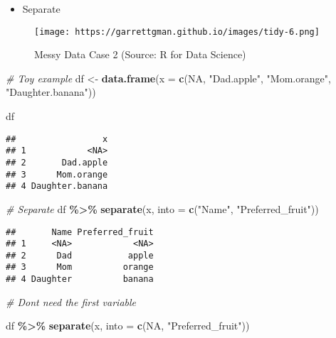 \documentclass[
]{book}
\newenvironment{Shaded}{\begin{snugshade}}{\end{snugshade}}
\newcommand{\CommentTok}[1]{\textcolor[rgb]{0.56,0.35,0.01}{\textit{#1}}}
\newcommand{\DataTypeTok}[1]{\textcolor[rgb]{0.13,0.29,0.53}{#1}}
\newcommand{\KeywordTok}[1]{\textcolor[rgb]{0.13,0.29,0.53}{\textbf{#1}}}
\newcommand{\NormalTok}[1]{#1}
\newcommand{\OperatorTok}[1]{\textcolor[rgb]{0.81,0.36,0.00}{\textbf{#1}}}
\newcommand{\OtherTok}[1]{\textcolor[rgb]{0.56,0.35,0.01}{#1}}
\newcommand{\StringTok}[1]{\textcolor[rgb]{0.31,0.60,0.02}{#1}}
\providecommand{\tightlist}{%
  \setlength{\itemsep}{0pt}\setlength{\parskip}{0pt}}
\begin{document}
\begin{itemize}
\tightlist
\item
  Separate
\end{itemize}

\begin{figure}
\centering
\texttt{[image: https://garrettgman.github.io/images/tidy-6.png]}
\caption{Messy Data Case 2 (Source: R for Data Science)}
\end{figure}

\begin{Shaded}
\begin{Highlighting}[]
\CommentTok{\# Toy example}
\NormalTok{df \textless{}{-}}\StringTok{ }\KeywordTok{data.frame}\NormalTok{(}\DataTypeTok{x =} \KeywordTok{c}\NormalTok{(}\OtherTok{NA}\NormalTok{, }\StringTok{"Dad.apple"}\NormalTok{, }\StringTok{"Mom.orange"}\NormalTok{, }\StringTok{"Daughter.banana"}\NormalTok{))}

\NormalTok{df}
\end{Highlighting}
\end{Shaded}

\begin{verbatim}
##                 x
## 1            <NA>
## 2       Dad.apple
## 3      Mom.orange
## 4 Daughter.banana
\end{verbatim}

\begin{Shaded}
\begin{Highlighting}[]
\CommentTok{\# Separate}
\NormalTok{df }\OperatorTok{\%\textgreater{}\%}
\StringTok{  }\KeywordTok{separate}\NormalTok{(x, }\DataTypeTok{into =} \KeywordTok{c}\NormalTok{(}\StringTok{"Name"}\NormalTok{, }\StringTok{"Preferred\_fruit"}\NormalTok{))}
\end{Highlighting}
\end{Shaded}

\begin{verbatim}
##       Name Preferred_fruit
## 1     <NA>            <NA>
## 2      Dad           apple
## 3      Mom          orange
## 4 Daughter          banana
\end{verbatim}

\begin{Shaded}
\begin{Highlighting}[]
\CommentTok{\# Don\textquotesingle{}t need the first variable}

\NormalTok{df }\OperatorTok{\%\textgreater{}\%}
\StringTok{  }\KeywordTok{separate}\NormalTok{(x, }\DataTypeTok{into =} \KeywordTok{c}\NormalTok{(}\OtherTok{NA}\NormalTok{, }\StringTok{"Preferred\_fruit"}\NormalTok{))}
\end{Highlighting}
\end{Shaded}
\end{document}
